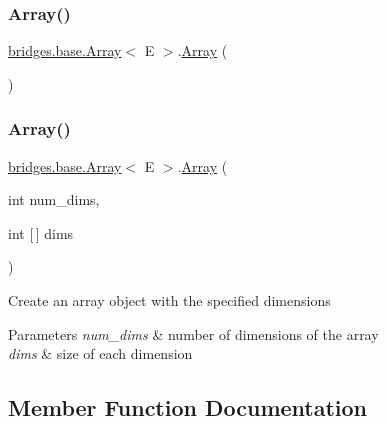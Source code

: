 \subsubsection{\texorpdfstring{Array()}{Array()}\hspace{0.1cm}{\footnotesize\ttfamily [1/2]}}
{\footnotesize\ttfamily \hyperlink{classbridges_1_1base_1_1_array}{bridges.\+base.\+Array}$<$ E $>$.\hyperlink{classbridges_1_1base_1_1_array}{Array} (\begin{DoxyParamCaption}{ }\end{DoxyParamCaption})}

\hypertarget{classbridges_1_1base_1_1_array_ab37dbe6efe0c34242456971e430763f7}{}\label{classbridges_1_1base_1_1_array_ab37dbe6efe0c34242456971e430763f7} 
\subsubsection{\texorpdfstring{Array()}{Array()}\hspace{0.1cm}{\footnotesize\ttfamily [2/2]}}
{\footnotesize\ttfamily \hyperlink{classbridges_1_1base_1_1_array}{bridges.\+base.\+Array}$<$ E $>$.\hyperlink{classbridges_1_1base_1_1_array}{Array} (\begin{DoxyParamCaption}\item[{int}]{num\+\_\+dims,  }\item[{int \mbox{[}$\,$\mbox{]}}]{dims }\end{DoxyParamCaption})}

Create an array object with the specified dimensions


\begin{DoxyParams}{Parameters}
{\em num\+\_\+dims} & number of dimensions of the array \\
\hline
{\em dims} & size of each dimension \\
\hline
\end{DoxyParams}


\subsection{Member Function Documentation}
\hypertarget{classbridges_1_1base_1_1_array_ad138b9787d46d053d6bd324b344be9a6}{}\label{classbridges_1_1base_1_1_array_ad138b9787d46d053d6bd324b344be9a6} 
